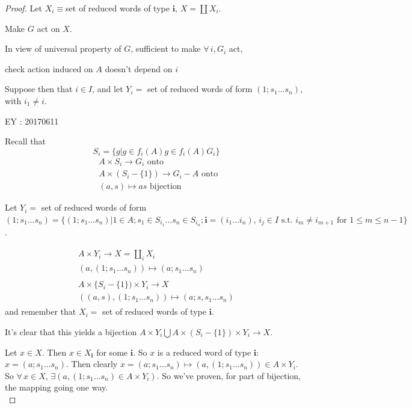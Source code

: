 \begin{proof}
Let $X_i \equiv $set of reduced words of type $\mathbf{i}$, $X = \coprod X_i$.  

Make $G$ act on $X$.  

In view of universal property of $G$, sufficient to make $\forall \, i, G_i$ act, 

check action induced on $A$ doesn't depend on $i$  

Suppose then that $i\in I$, and let $Y_i = $ set of reduced words of form $(1;s_1 \dots s_n)$, with $i_1\neq i$.  

EY : 20170611

Recall that 
\[
S_i = \lbrace g| g\in f_i(A) g \in f_i(A) G_i \rbrace
\]
\[
\begin{aligned}
	& A \times S_i \to G_i \text{ onto } \\ 
	& A\times (S_i - \lbrace 1 \rbrace) \to G_i - A \text{ onto } \\ 
	& (a,s) \mapsto as \text{ bijection }
\end{aligned}
\]

Let $Y_i = $ set of reduced words of form $(1; s_1 \dots s_n) = \lbrace (1;s_1 \dots s_n) | 1\in A; s_1 \in S_{i_1}\dots s_n \in S_{i_n} ; \mathbf{i} = (i_1\dots i_n), \, i_j \in I \text{ s.t. } i_m \neq i_{m+1} \text{ for } 1\leq m \leq n -1 \rbrace$.  

\[
\begin{gathered}
\begin{gathered}
A \times Y_i \to X = \coprod_i X_i \\
(a,(1; s_1 \dots s_n)) \mapsto (a; s_1 \dots s_n)
\end{gathered} \\
\begin{gathered}
A\times \lbrace S_i - \lbrace 1 \rbrace ) \times Y_i \to X \\
((a,s), (1;s_1 \dots s_n)) \mapsto (a;s,s_1\dots s_n)
\end{gathered}
\end{gathered}
\]
and remember that $X_i = $ set of reduced words of type $\mathbf{i}$.  

It's clear that this yields a bijection $A\times Y_i \bigcup A\times (S_i - \lbrace 1 \rbrace) \times Y_i \to X$.  

Let $x\in X$.  Then $x\in X_{\mathbf{i}}$ for some $\mathbf{i}$.  So $x$ is a reduced word of type $\mathbf{i}$: $x = (a;s_1\dots s_n)$.  Then clearly $x = (a;s_1\dots s_n) \mapsto (a,(1;s_1\dots s_n)) \in A\times Y_i$.  So $\forall \, x \in X$, $\exists (a, (1; s_1 \dots s_n) \in A \times Y_i)$. So we've proven, for part of bijection, the mapping going one way. \\


\end{proof}
